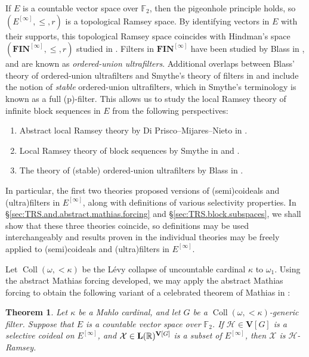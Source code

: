 \documentclass[10pt,a4paper]{amsart}
\theoremstyle{plain}
\numberwithin{equation}{section}
\newtheorem{theorem}{Theorem}[section]
\theoremstyle{definition}
\newcommand{\func}{\operatorname}
\newcommand{\R}{\mathbb{R}}
\newcommand{\cal}{\mathcal}
\renewcommand{\bf}{\mathbf}
\newcommand{\Coll}{\func{Coll}}
\newcommand{\FIN}{\bf{FIN}}
\newcommand{\V}{\bf{V}}
\newcommand{\X}{\cal{X}}
\renewcommand{\H}{\cal{H}}
\let\strokeL\L
\DeclareRobustCommand{\L}{\ifmmode\mathbf{L}\else\strokeL\fi}
\let\Sec\S
\renewcommand{\S}{\mathcal{S}}
\begin{document}
If $E$ is a countable vector space over $\mathbb{F}_2$, then the pigeonhole principle holds, so $(E^{[\infty]},\leq,r)$ is a topological Ramsey space. By identifying vectors in $E$ with their supports, this topological Ramsey space coincides with Hindman's space $(\FIN^{[\infty]},\leq,r)$ studied in \cite{B87}. Filters in $\FIN^{[\infty]}$ have been studied by Blass in \cite{B87}, and are known as \emph{ordered-union ultrafilters}. Additional overlaps between Blass' theory of ordered-union ultrafilters and Smythe's theory of filters in \cite{S18} and \cite{S23} include the notion of \emph{stable} ordered-union ultrafilters, which in Smythe's terminology is known as a full (p)-filter. This allows us to study the local Ramsey theory of infinite block sequences in $E$ from the following perspectives:
\begin{enumerate}
    \item Abstract local Ramsey theory by Di Prisco--Mijares--Nieto in \cite{DMN15}.
    
    \item Local Ramsey theory of block sequences by Smythe in \cite{S18} and \cite{S23}.
    
    \item The theory of (stable) ordered-union ultrafilters by Blass in \cite{B87}.
\end{enumerate}
In particular, the first two theories proposed versions of (semi)coideals and (ultra)filters in $E^{[\infty]}$, along with definitions of various selectivity properties. In \Sec\ref{sec:TRS.and.abstract.mathias.forcing} and \Sec\ref{sec:TRS.block.subspaces}, we shall show that these three theories coincide, so definitions may be used interchangeably and results proven in the individual theories may be freely applied to (semi)coideals and (ultra)filters in $E^{[\infty]}$.

Let $\Coll(\omega,<\!\kappa)$ be the L\'{e}vy collapse of uncountable cardinal $\kappa$ to $\omega_1$. Using the abstract Mathias forcing developed, we may apply the abstract Mathias forcing to obtain the following variant of a celebrated theorem of Mathias in \cite{M77}:
\begin{theorem}
\label{thm:mathias.thm.vector.spaces}
    Let $\kappa$ be a Mahlo cardinal, and let $G$ be a $\Coll(\omega,<\!\kappa)$-generic filter. Suppose that $E$ is a countable vector space over $\mathbb{F}_2$. If $\H \in \V[G]$ is a selective coideal on $E^{[\infty]}$, and $\X \in \L(\R)^{\V[G]}$ is a subset of $E^{[\infty]}$, then $\X$ is $\H$-Ramsey.
\end{theorem}
\end{document}
